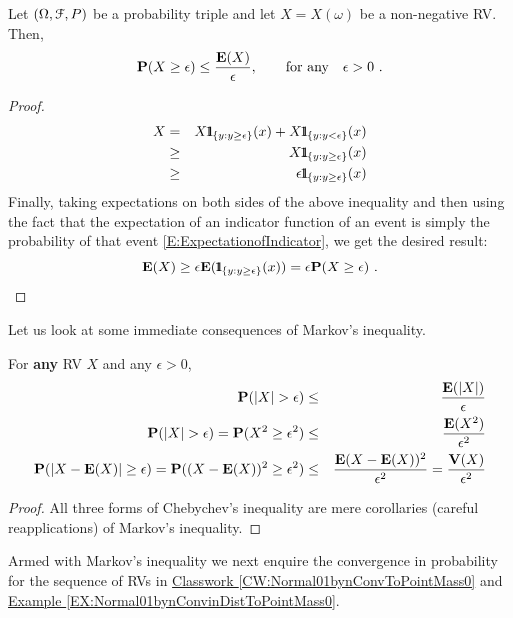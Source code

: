 \begin{prop}
Let $(\Omega,\mathcal{F},P)$ be a probability triple and let $X=X(\omega)$ be a non-negative RV.  Then,
\begin{equation}\label{E:MarkovNeq}
\mathbf{P}(X \geq \epsilon) \leq \frac{\mathbf{E}(X)}{\epsilon}, \qquad \text{for any} \quad \epsilon > 0 \ .
\end{equation}
{\normalsize
\begin{proof}
\begin{eqnarray}
X &=& X \BB{1}_{ \{y: y \geq \epsilon \} } (x) + X \BB{1}_{ \{y: y < \epsilon \} } (x) \notag \\
&\geq& X \BB{1}_{ \{y: y \geq \epsilon \} } (x) \notag \\
&\geq& \epsilon  \BB{1}_{ \{y: y \geq \epsilon \} } (x) \notag \\
\end{eqnarray}
Finally, taking expectations on both sides of the above inequality and then using the fact that the expectation of an indicator function of an event is simply the probability of that event \eqref{E:ExpectationofIndicator}, we get the desired result:
\[
\mathbf{E}(X) \geq \epsilon \mathbf{E}( {1}\mspace{-11 mu}{1}_{ \{y: y \geq \epsilon \} } (x)) = \epsilon \mathbf{P}(X \geq \epsilon) \ .
\]
\end{proof}
}
\end{prop}
Let us look at some immediate consequences of Markov's inequality.
\begin{prop}
For {\bf any} RV $X$ and any $\epsilon > 0$,
\begin{eqnarray}
\mathbf{P}(|X| > \epsilon) &\leq& \frac{\mathbf{E}(|X|)}{\epsilon} \label{E:ChebychevNeq1} \\
\mathbf{P}(|X| > \epsilon) = \mathbf{P}(X^2 \geq \epsilon^2) &\leq& \frac{\mathbf{E}(X^2)}{\epsilon^2} \label{E:ChebychevNeq2} \\
\mathbf{P}(|X-\mathbf{E}(X)| \geq \epsilon) = \mathbf{P}((X-\mathbf{E}(X))^2 \geq \epsilon^2) &\leq& \frac{\mathbf{E}(X-\mathbf{E}(X))^2}{\epsilon^2}  = \frac{\mathbf{V}(X)}{\epsilon^2}  \label{E:ChebychevNeq3} 
\end{eqnarray}
{\normalsize
\begin{proof}
All three forms of Chebychev's inequality are mere corollaries (careful reapplications) of Markov's inequality.
\end{proof}
}
\end{prop}

Armed with Markov's inequality we next enquire the convergence in probability for the sequence of RVs in \hyperref[CW:Normal01bynConvToPointMass0]{Classwork \ref*{CW:Normal01bynConvToPointMass0}} and \hyperref[EX:Normal01bynConvinDistToPointMass0]{Example \ref*{EX:Normal01bynConvinDistToPointMass0}}.

